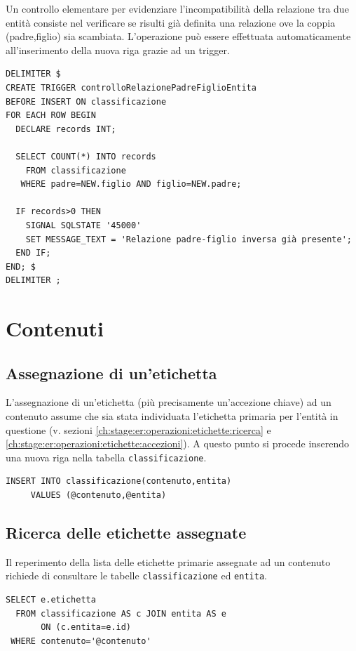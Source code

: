 \documentclass[10pt,a4paper,headinclude,footinclude,hidelinks]{scrreprt} %
\begin{document}
	Un controllo elementare per evidenziare l'incompatibilità della relazione tra due entità consiste nel verificare se risulti già definita una relazione ove la coppia (padre,figlio) sia scambiata. L'operazione può essere effettuata automaticamente all'inserimento della nuova riga grazie ad un trigger.
	
\begin{verbatim}
DELIMITER $
CREATE TRIGGER controlloRelazionePadreFiglioEntita
BEFORE INSERT ON classificazione
FOR EACH ROW BEGIN
  DECLARE records INT;

  SELECT COUNT(*) INTO records
    FROM classificazione
   WHERE padre=NEW.figlio AND figlio=NEW.padre;

  IF records>0 THEN
    SIGNAL SQLSTATE '45000'
    SET MESSAGE_TEXT = 'Relazione padre-figlio inversa già presente';
  END IF;
END; $
DELIMITER ;
\end{verbatim}

	\section{Contenuti}
	\subsection{Assegnazione di un'etichetta}
	L'assegnazione di un'etichetta (più precisamente un'accezione chiave) ad un contenuto assume che sia stata individuata l'etichetta primaria per l'entità in questione (v. sezioni \ref{ch:stage:er:operazioni:etichette:ricerca} e \ref{ch:stage:er:operazioni:etichette:accezioni}). A questo punto si procede inserendo una nuova riga nella tabella \texttt{classificazione}.
\begin{verbatim}
INSERT INTO classificazione(contenuto,entita)
     VALUES (@contenuto,@entita)
\end{verbatim}

	\subsection{Ricerca delle etichette assegnate}
	Il reperimento della lista delle etichette primarie	assegnate ad un contenuto richiede di consultare le tabelle \texttt{classificazione} ed \texttt{entita}.
\begin{verbatim}
SELECT e.etichetta
  FROM classificazione AS c JOIN entita AS e
       ON (c.entita=e.id)
 WHERE contenuto='@contenuto'
\end{verbatim}
\end{document}
